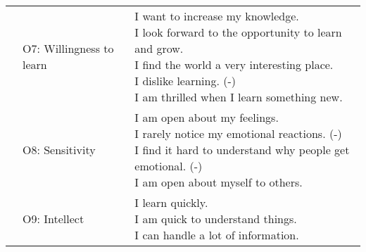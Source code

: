 \begin{appendix}
\begin{longtable}[t]{lll}
\addlinespace
 & O7: Willingness to learn & \makecell[l]{I want to increase my knowledge.\\I look forward to the opportunity to learn and grow.\\I find the world a very interesting place.\\I dislike learning. (-)\\I am thrilled when I learn something new.}\\
\addlinespace
 & O8: Sensitivity & \makecell[l]{I am open about my feelings.\\I rarely notice my emotional reactions. (-)\\I find it hard to understand why people get emotional. (-)\\I am open about myself to others.}\\
\addlinespace
 & O9: Intellect & \makecell[l]{I learn quickly.\\I am quick to understand things.\\I can handle a lot of information.}\\*
\end{longtable}
\end{appendix}
